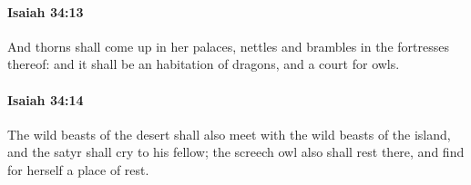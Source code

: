 		\paragraph{Isaiah 34:13} %
			\label{ISAIAH-34-13}

			And thorns shall come up in her palaces, nettles and brambles in the fortresses thereof: and it shall be an habitation of dragons, and a court for owls.


		\paragraph{Isaiah 34:14} %
			\label{ISAIAH-34-14}

			The wild beasts of the desert shall also meet with the wild beasts of the island, and the satyr shall cry to his fellow; the screech owl also shall rest there, and find for herself a place of rest.


